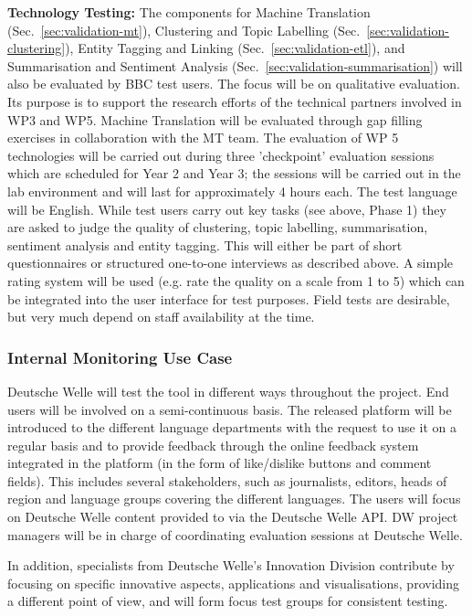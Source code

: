 \textbf{Technology Testing:}
The components for 
Machine Translation (Sec.~\ref{sec:validation-mt}), 
Clustering and Topic Labelling (Sec.~\ref{sec:validation-clustering}), 
Entity Tagging and Linking (Sec.~\ref{sec:validation-etl}), and 
Summarisation and Sentiment Analysis (Sec.~\ref{sec:validation-summarisation}) 
will also be evaluated by BBC test users. The focus will be on qualitative evaluation. Its purpose is to support the research efforts of the technical partners involved in WP3 and WP5. Machine Translation will be evaluated through gap filling exercises in collaboration with the MT team. The evaluation of WP 5 technologies will be carried out during three 'checkpoint' evaluation sessions which are scheduled for Year 2 and Year 3; the sessions will be carried out in the lab environment and will last for approximately 4 hours each. The test language will be English. While test users carry out key tasks (see above, Phase 1) they are asked to judge the quality of clustering, topic labelling, summarisation, sentiment analysis and entity tagging. This will either be part of short questionnaires or structured one-to-one interviews as described above. A simple rating system will be used (e.g. rate the quality on a scale from 1 to 5) which can be integrated into the user interface for test purposes. Field tests are desirable, but very much depend on staff availability at the time.



\subsubsection{Internal Monitoring Use Case}

Deutsche Welle will test the tool in different ways throughout the project. End users will be involved on a semi-continuous basis. The released  platform will be introduced to the different language departments with the request to use it on a regular basis and to provide feedback through the online feedback system integrated in the platform (in the form of like/dislike buttons and comment fields). This includes several stakeholders, such as journalists, editors, heads of region and language groups covering the different \SUMMA languages. The users will focus on Deutsche Welle content provided to \SUMMA via the Deutsche Welle API. DW \SUMMA project managers will be in charge of coordinating evaluation sessions at Deutsche Welle. 

In addition, specialists from Deutsche Welle’s Innovation Division contribute by focusing on specific innovative aspects, applications and visualisations, providing a different point of view, and will form focus test groups for consistent testing.

